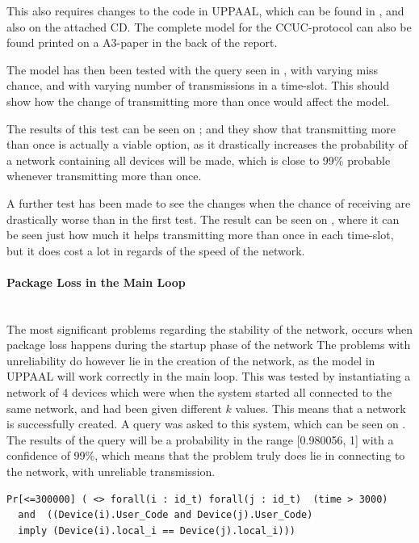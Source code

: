 This also requires changes to the code in UPPAAL, which can be found in , and also on the attached CD.
The complete model for the CCUC-protocol can also be found printed on a A3-paper in the back of the report.

The model has then been tested with the query seen in , with varying miss chance, and with varying number of transmissions in a time-slot.
This should show how the change of transmitting more than once would affect the model.

The results of this test can be seen on ; and they show that transmitting more than once is actually a viable option, as it drastically increases the probability of a network containing all devices will be made, which is close to 99\% probable whenever transmitting more than once.

A further test has been made to see the changes when the chance of receiving are drastically worse than in the first test.
The result can be seen on , where it can be seen just how much it helps transmitting more than once in each time-slot, but it does cost a lot in regards of the speed of the network.

\paragraph{Package Loss in the Main Loop}\hfill \\
The most significant problems regarding the stability of the network, occurs when package loss happens during the startup phase of the network
The problems with unreliability do however lie in the creation of the network, as the model in UPPAAL will work correctly in the main loop.
This was tested by instantiating a network of 4 devices which were when the system started all connected to the same network, and had been given different $k$ values. 
This means that a network is successfully created.
A query was asked to this system, which can be seen on .
The results of the query will be a probability in the range [0.980056, 1] with a confidence of 99\%, which means that the problem truly does lie in connecting to the network, with unreliable transmission. 

\begin{lstlisting}[style=UPPAAL, caption={Query for UPPAAL asking if for all devices i and j, when they are in the location \texttt{User\_Code} will they have they then have the same value for \texttt{local\_i}.}, label={stable-network-query}, float=!hb]
Pr[<=300000] ( <> forall(i : id_t) forall(j : id_t)  (time > 3000) 
  and  ((Device(i).User_Code and Device(j).User_Code) 
  imply (Device(i).local_i == Device(j).local_i)))
\end{lstlisting}
 
